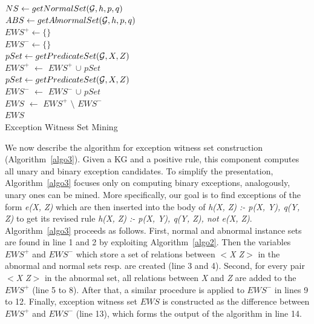 \IncMargin{1.5em}
\begin{algorithm}[h]
\DontPrintSemicolon
\SetAlgoLined
{}
\BlankLine
$NS \leftarrow getNormalSet(\mathcal{G}, h, p, q)$\\
$ABS \leftarrow getAbnormalSet(\mathcal{G}, h, p, q)$\\
$EWS^+ \leftarrow \{\}$\\
$EWS^- \leftarrow \{\}$\\
\BlankLine
{} {
	$pSet \leftarrow getPredicateSet(\mathcal{G}, X, Z)$\\
	$EWS^+$ $\leftarrow$ $EWS^+$ $\cup$ $pSet$\\
}
 {
	$pSet \leftarrow getPredicateSet(\mathcal{G}, X, Z)$\\
	$EWS^-$ $\leftarrow$ $EWS^-$ $\cup$ $pSet$\\
}
$EWS$ $\leftarrow$ $EWS^+$ $\setminus$ $EWS^-$\\
\Return $EWS$\\
\caption{Exception Witness Set Mining}
\label{algo3}
\end{algorithm}
\DecMargin{1.5em}

We now describe the algorithm for exception witness set construction (Algorithm~\ref{algo3}). Given a KG and a positive rule, this component computes all unary and binary exception candidates. To simplify the presentation, Algorithm~\ref{algo3} focuses only on computing binary exceptions, analogously, unary ones can be mined. More specifically, our goal is to find exceptions of the form \textit{e(X, Z)} which are then inserted into the body of \textit{h(X, Z) :- p(X, Y), q(Y, Z)} to get its revised rule \textit{h(X, Z) :- p(X, Y), q(Y, Z), not e(X, Z)}. Algorithm~\ref{algo3} proceeds as follows. First, normal and abnormal instance sets are found in line 1 and 2 by exploiting Algorithm~\ref{algo2}. Then the variables $EWS^+$ and $EWS^-$ which store a set of relations between \textit{$<$X Z$>$} in the abnormal and normal sets resp. are created (line 3 and 4). Second, for every pair \textit{$<$X Z$>$} in the abnormal set, all relations between \textit{X} and \textit{Z} are added to the $EWS^+$ (line 5 to 8). After that, a similar procedure is applied to $EWS^-$ in lines 9 to 12. Finally, exception witness set $EWS$ is constructed as the difference between $EWS^+$ and $EWS^-$ (line 13), which forms the output of the algorithm in line 14.

